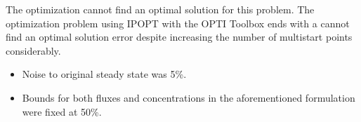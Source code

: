 \documentclass[10pt]{report}
\begin{document}
	The optimization cannot find an optimal solution for this problem. The optimization problem using IPOPT with the OPTI Toolbox  ends with a cannot find an optimal solution error despite increasing the number of multistart points considerably.
	
	\begin{itemize}
		\item Noise to original steady state was 5\%.
		\item Bounds for both fluxes and concentrations in the aforementioned formulation were fixed at 50\%.
	\end{itemize} 

	
\end{document}
